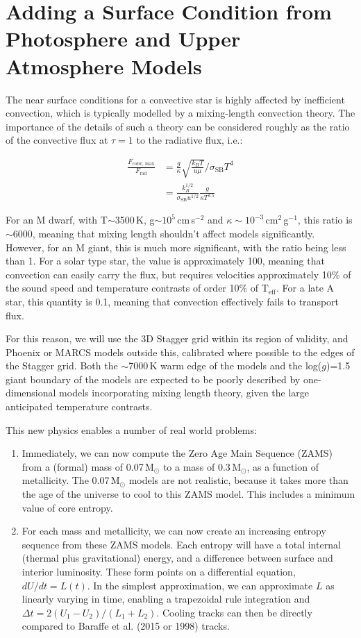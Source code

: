 \documentclass[12pt]{article}
\begin{document}
\section{Adding a Surface Condition from Photosphere and Upper Atmosphere Models}

The near surface conditions for a convective star is highly affected by inefficient convection, which is typically modelled by a mixing-length convection theory. The importance of the details of such a theory can be considered roughly as the ratio of the convective flux at $\tau=1$ to the radiative flux, i.e.:

\begin{align}
\frac{F_\text{conv, max}}{F_\text{rad}} &= \frac{g}{\kappa} \sqrt{\frac{k_B T}{u \mu}}  / \sigma_\text{SB} T^4 \\
&= \frac{k_B^{1/2}}{\sigma_\text{SB} u^{1/2}} \frac{g}{\kappa T^{3.5}}
\end{align}

For an M dwarf, with T$\sim$3500\,K, g$\sim10^{5}$\,cm\,s$^{-2}$ and $\kappa \sim 10^{-3}$\,cm$^2$\,g$^{-1}$, this ratio is $\sim$6000, meaning that mixing length shouldn't affect models significantly. However, for an M giant, this is much more significant, with the ratio being less than 1. For a solar type star, the value is approximately 100, meaning that convection can easily carry the flux, but requires velocities approximately 10\% of the sound speed and temperature contrasts of order 10\% of T$_\text{eff}$. For a late A star, this quantity is 0.1, meaning that convection effectively fails to transport flux.

For this reason, we will use the 3D Stagger grid within its region of validity, and Phoenix or MARCS models outside this, calibrated where possible to the edges of the Stagger grid. Both the $\sim$7000\,K warm edge of the models and the log($g$)=1.5 giant boundary of the models are expected to be poorly described by one-dimensional models incorporating mixing length theory, given the large anticipated temperature contrasts.

This new physics enables a number of real world problems:

\begin{enumerate}
\item Immediately, we can now compute the Zero Age Main Sequence (ZAMS) from a (formal) mass of 0.07\,M$_\odot$ to a mass of 0.3\,M$_\odot$, as a function of metallicity. The 0.07\,M$_\odot$ models are not realistic, because it takes more than the age of the universe to cool to this ZAMS model. This includes a minimum value of core entropy. 
\item For each mass and metallicity, we can now create an increasing entropy sequence from these ZAMS models. Each entropy will have a total internal (thermal plus gravitational) energy, and a difference between surface and interior luminosity. These form points on a differential equation, $dU/dt = L(t)$. In the simplest approximation, we can approximate $L$ as linearly varying in time, enabling a trapezoidal rule integration and $\Delta t = 2(U_1 - U_2)/(L_1 + L_2)$. Cooling tracks can then be directly compared to Baraffe et al. (2015 or 1998) tracks.
\end{enumerate}
\end{document}

